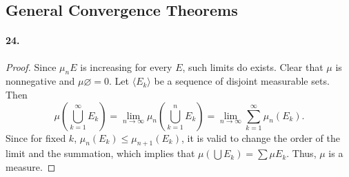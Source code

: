 \subsection{General Convergence Theorems}
  \paragraph{24.}
  \begin{proof}
    Since $\mu_n E$ is increasing for every $E$, such limits do exists. Clear 
    that $\mu$ is nonnegative and $\mu\varnothing=0$. Let $\langle E_k\rangle$ 
    be a sequence of disjoint measurable sets. Then
    \[
      \mu\left(\bigcup_{k=1}^\infty E_k\right)=
      \lim_{n\to\infty}\mu_n\left(\bigcup_{k=1}^n E_k\right)=
      \lim_{n\to\infty}\sum_{k=1}^\infty\mu_n(E_k).
    \]
    Since for fixed $k$, $\mu_n(E_k)\le\mu_{n+1}(E_k)$, it is valid to change 
    the order of the limit and the summation, which implies that $\mu(\bigcup
    E_k)=\sum\mu E_k$. Thus, $\mu$ is a measure.
  \end{proof}
  












